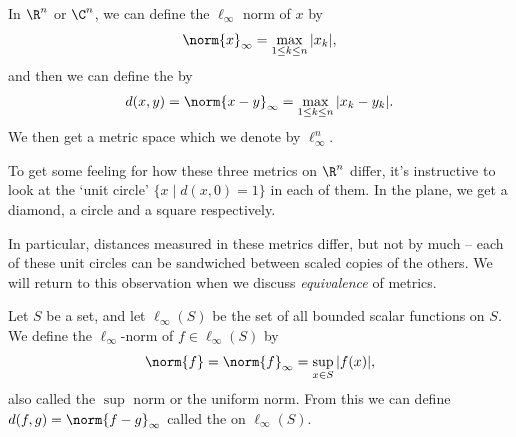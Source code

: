 \begin{example}
In $\R^n$ or $\C^n$, we can define the $\ell_{\infty}$ norm of $x$ by
$$
    \norm{x}_{\infty} = \max_{1 \leq k \leq n} |x_k|,
$$
and then we can define the  by
$$
d(x, y) = \norm{x - y}_{\infty} = \max_{1 \leq k \leq n} |x_k - y_k|.
$$
We then get a metric space which we denote by $\ell_{\infty}^n$.
\end{example}

To get some feeling for how these three metrics on $\R^n$ differ, it's instructive to look at the `unit circle' $\{x \mid d(x, 0) = 1\}$ in each of them. In the plane, we get a diamond, a circle and a square respectively.

\begin{center}
\end{center}

In particular, distances measured in these metrics differ, but not by much -- each of these unit circles can be sandwiched between scaled copies of the others. We will return to this observation when we discuss \emph{equivalence} of metrics.

\begin{example}
    Let $S$ be a set, and let $\ell_{\infty}(S)$ be the set of all bounded scalar functions on $S$. We define the $\ell_{\infty}$-norm of $f \in \ell_{\infty}(S)$ by
    $$
    \norm{f} = \norm{f}_{\infty} = \sup_{x \in S}|f(x)|,
    $$
    also called the $\sup$ norm or the uniform norm. From this we can define $d(f, g) = \norm{f - g}_{\infty}$ called the  on $\ell_{\infty}(S)$.
\end{example}

